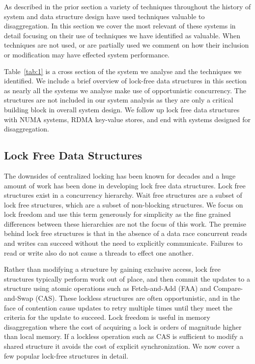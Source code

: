 As described in the prior section a variety of techniques throughout the history
of system and data structure design have used techniques valuable to
disaggregation. In this section we cover the most relevant of these systems in
detail focusing on their use of techniques we have identified as valuable. When
techniques are not used, or are partially used we comment on how their inclusion
or modification may have effected system performance.

Table~\ref{tab:1} is a cross section of the system we analyse and the techniques
we identified. We include a brief overview of lock-free data structures in this
section as nearly all the systems we analyse make use of opportunistic
concurrency. The structures are not included in our system analysis as they are
only a critical building block in overall system design. We follow up lock free
data structures with NUMA systems, RDMA key-value stores, and end with systems
designed for disaggregation.

\subsection{Lock Free Data Structures}

The downsides of centralized locking has been known for decades and a huge
amount of work has been done in developing lock free data structures. Lock free
structures exist in a concurrency hierarchy. Wait free structures are a subset
of lock free structures, which are a subset of non-blocking structures. We focus
on lock freedom and use this term generously for simplicity as the fine grained
differences between these hierarchies are not the focus of this work.  The
premise behind lock free structures is that in the absence of a data race
concurrent reads and writes can succeed without the need to explicitly
communicate. Failures to read or write also do not cause a threads to effect one
another.

Rather than modifying a structure by gaining exclusive access, lock free
structures typically perform work out of place, and then commit the updates to a
structure using atomic operations such as Fetch-and-Add (FAA) and
Compare-and-Swap (CAS). These lockless structures are often opportunistic, and
in the face of contention cause updates to retry multiple times until they meet
the criteria for the update to succeed. Lock freedom is useful in memory
disaggregation where the cost of acquiring a lock is orders of magnitude higher
than local memory. If a lockless operation such as CAS is sufficient to modify a
shared structure it avoids the cost of explicit synchronization. We now cover a
few popular lock-free structures in detail.

